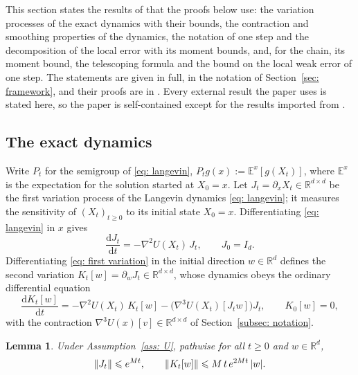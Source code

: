 \documentclass[namedate,webpdf,imanum]{ima-authoring-template}
\newcommand{\Le}{\leqslant}
\newcommand{\Ge}{\geqslant}
\newcommand{\D}{\mathrm{d}}
\theoremstyle{thmstyletwo}
\newtheorem{lemma}{Lemma}
\numberwithin{equation}{section}
\begin{document}
This section states the results of \citet{ye2026mse} that the proofs below use: the variation processes of the exact dynamics with their bounds, the contraction and smoothing properties of the dynamics, the notation of one step and the decomposition of the local error with its moment bounds, and, for the chain, its moment bound, the telescoping formula and the bound on the local weak error of one step. The statements are given in full, in the notation of Section~\ref{sec: framework}, and their proofs are in \citet{ye2026mse}. Every external result the paper uses is stated here, so the paper is self-contained except for the results imported from \citet{ye2026mse}.

\subsection{The exact dynamics}
\label{sec: gradient}

Write $P_t$ for the semigroup of \eqref{eq: langevin}, $P_t g(x) := \mathbb E^x[g(X_t)]$, where $\mathbb E^x$ is the expectation for the solution started at $X_0 = x$. Let $J_t = \partial_x X_t \in \mathbb R^{d\times d}$ be the first variation process of the Langevin dynamics \eqref{eq: langevin}; it measures the sensitivity of $(X_t)_{t \Ge 0}$ to its initial state $X_0 = x$. Differentiating \eqref{eq: langevin} in $x$ gives
\begin{equation}
    \frac{\D J_t}{\D t} = -\nabla^2 U(X_t)\, J_t , \qquad J_0 = I_d.
    \label{eq: first variation}
\end{equation}
Differentiating \eqref{eq: first variation} in the initial direction $w \in \mathbb R^d$ defines the second variation $K_t[w] = \partial_w J_t \in \mathbb R^{d\times d}$, whose dynamics obeys the ordinary differential equation
\begin{equation}
    \frac{\D K_t[w]}{\D t} = -\nabla^2 U(X_t)\, K_t[w] - \bigl(\nabla^3 U(X_t)[J_t w]\bigr) J_t , \qquad K_0[w] = 0 ,
    \label{eq: second variation}
\end{equation}
with the contraction $\nabla^3 U(x)[v] \in \mathbb R^{d\times d}$ of Section~\ref{subsec: notation}.

\begin{lemma}
\label{lem: variation bounds}
    Under Assumption~\ref{ass: U}, pathwise for all $t \Ge 0$ and $w \in \mathbb R^d$,
    \begin{equation*}
        \norm{J_t} \Le e^{M t} , \qquad
        \norm{K_t[w]} \Le M\, t\, e^{2M t}\, |w| .
    \end{equation*}
\end{lemma}
\end{document}
